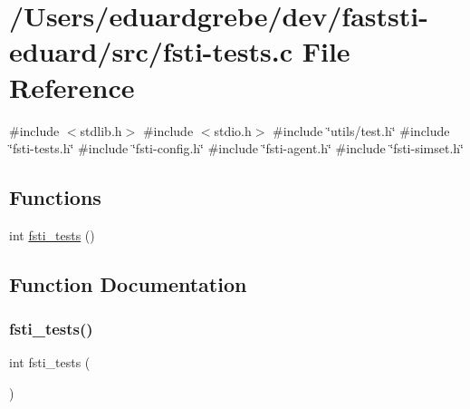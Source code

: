 \hypertarget{fsti-tests_8c}{}\section{/\+Users/eduardgrebe/dev/faststi-\/eduard/src/fsti-\/tests.c File Reference}
\label{fsti-tests_8c}
{\ttfamily \#include $<$stdlib.\+h$>$}\newline
{\ttfamily \#include $<$stdio.\+h$>$}\newline
{\ttfamily \#include \char`\"{}utils/test.\+h\char`\"{}}\newline
{\ttfamily \#include \char`\"{}fsti-\/tests.\+h\char`\"{}}\newline
{\ttfamily \#include \char`\"{}fsti-\/config.\+h\char`\"{}}\newline
{\ttfamily \#include \char`\"{}fsti-\/agent.\+h\char`\"{}}\newline
{\ttfamily \#include \char`\"{}fsti-\/simset.\+h\char`\"{}}\newline
\subsection*{Functions}
\begin{DoxyCompactItemize}
\item 
int \mbox{\hyperlink{fsti-tests_8c_a6d22e84aa78560b52172df37e4c4923f}{fsti\+\_\+tests}} ()
\end{DoxyCompactItemize}


\subsection{Function Documentation}
\mbox{\label{fsti-tests_8c_a6d22e84aa78560b52172df37e4c4923f}} 
\subsubsection{\texorpdfstring{fsti\+\_\+tests()}{fsti\_tests()}}
{\footnotesize\ttfamily int fsti\+\_\+tests (\begin{DoxyParamCaption}{ }\end{DoxyParamCaption})}

